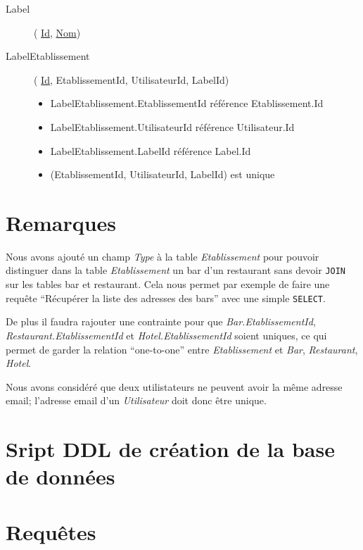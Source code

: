 \documentclass[10pt,a4paper]{article}
\begin{document}
\begin{description}
\item[Label](
    \underline{Id},
    \underline{Nom})

\item[LabelEtablissement](
    \underline{Id},
    EtablissementId,
    UtilisateurId,
    LabelId)

    \begin{itemize}
        \item LabelEtablissement.EtablissementId référence Etablissement.Id
        \item LabelEtablissement.UtilisateurId référence Utilisateur.Id
        \item LabelEtablissement.LabelId référence Label.Id
        \item (EtablissementId, UtilisateurId, LabelId) est unique
    \end{itemize}

\end{description}

\section{Remarques}

Nous avons ajouté un champ \textit{Type} à la table \textit{Etablissement} pour pouvoir distinguer dans la table \textit{Etablissement} un bar d'un restaurant sans devoir \texttt{JOIN} sur les tables bar et restaurant. Cela nous permet par exemple de faire une requête ``Récupérer la liste des adresses des bars'' avec une simple \texttt{SELECT}.

De plus il faudra rajouter une contrainte pour que \textit{Bar.EtablissementId}, \textit{Restaurant.EtablissementId} et \textit{Hotel.EtablissementId} soient uniques, ce qui permet de garder la relation ``one-to-one'' entre \textit{Etablissement} et \textit{Bar}, \textit{Restaurant}, \textit{Hotel}.

Nous avons considéré que deux utilistateurs ne peuvent avoir la même adresse email; l'adresse email d'un \textit{Utilisateur} doit donc être unique.


\section{Sript DDL de création de la base de données}

\section{Requêtes}

\end{document}
